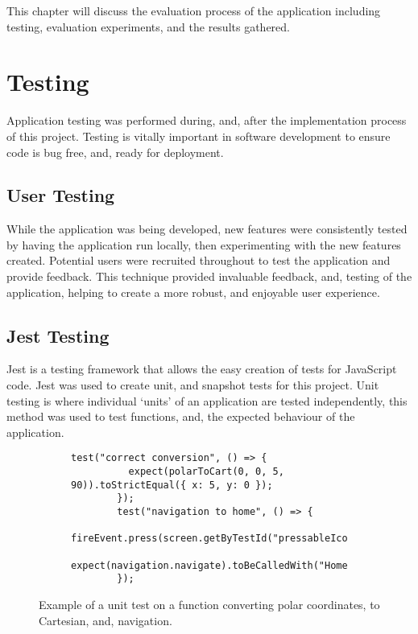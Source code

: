 This chapter will discuss the evaluation process of the application including testing, evaluation experiments, and the results gathered.

\section{Testing}
Application testing was performed during, and, after the implementation process of this project. Testing is vitally important in software development to ensure code is bug free, and, ready for deployment.

\subsection{User Testing}
While the application was being developed, new features were consistently tested by having the application run locally, then experimenting with the new features created. Potential users were recruited throughout to test the application and provide feedback. This technique provided invaluable feedback, and, testing of the application, helping to create a more robust, and enjoyable user experience.

\subsection{Jest Testing}
Jest is a testing framework that allows the easy creation of tests for JavaScript code. Jest was used to create unit, and snapshot tests for this project. Unit testing is where individual `units' of an application are tested independently, this method was used to test functions, and, the expected behaviour of the application. 

\begin{figure}[!htbp]
    \centering
    \begin{subfigure}[b]{0.8\textwidth}
        \begin{lstlisting}[language=jsJsx]
        test("correct conversion", () => {
          expect(polarToCart(0, 0, 5, 90)).toStrictEqual({ x: 5, y: 0 });
        });
        test("navigation to home", () => {
            fireEvent.press(screen.getByTestId("pressableIcon"));
            expect(navigation.navigate).toBeCalledWith("HomeScreen");
        });
        \end{lstlisting}
    \end{subfigure}
\caption[Example of a unit test]{Example of a unit test on a function converting polar coordinates, to Cartesian, and, navigation.}
\label{fig:jestUnit}
\end{figure}
\FloatBarrier

